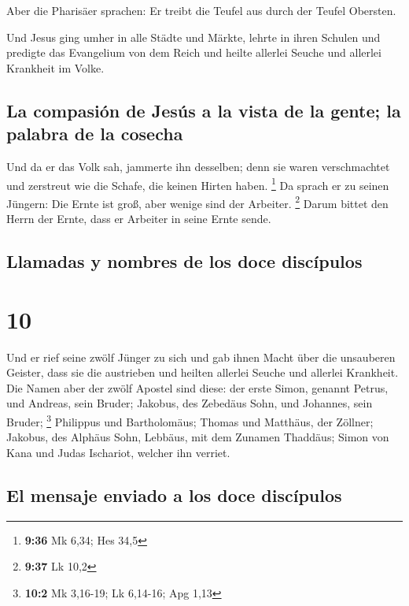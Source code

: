 Aber die Pharisäer sprachen: Er treibt die Teufel aus
durch der Teufel Obersten.

 Und Jesus ging umher in alle Städte und Märkte, lehrte
in ihren Schulen und predigte das Evangelium von dem Reich und heilte
allerlei Seuche und allerlei Krankheit im Volke.

\hypertarget{la-compasiuxf3n-de-jesuxfas-a-la-vista-de-la-gente-la-palabra-de-la-cosecha}{%
\subsection{La compasión de Jesús a la vista de la gente; la palabra de
la
cosecha}\label{la-compasiuxf3n-de-jesuxfas-a-la-vista-de-la-gente-la-palabra-de-la-cosecha}}

 Und da er das Volk sah, jammerte ihn desselben; denn sie
waren verschmachtet und zerstreut wie die Schafe, die keinen Hirten
haben. \footnote{\textbf{9:36} Mk 6,34; Hes 34,5}  Da
sprach er zu seinen Jüngern: Die Ernte ist groß, aber wenige sind der
Arbeiter. \footnote{\textbf{9:37} Lk 10,2}  Darum bittet
den Herrn der Ernte, dass er Arbeiter in seine Ernte sende.

\hypertarget{llamadas-y-nombres-de-los-doce-discuxedpulos}{%
\subsection{Llamadas y nombres de los doce
discípulos}\label{llamadas-y-nombres-de-los-doce-discuxedpulos}}

\hypertarget{section-9}{%
\section{10}\label{section-9}}

 Und er rief seine zwölf Jünger zu sich und gab ihnen
Macht über die unsauberen Geister, dass sie die austrieben und heilten
allerlei Seuche und allerlei Krankheit.  Die Namen aber
der zwölf Apostel sind diese: der erste Simon, genannt Petrus, und
Andreas, sein Bruder; Jakobus, des Zebedäus Sohn, und Johannes, sein
Bruder; \footnote{\textbf{10:2} Mk 3,16-19; Lk 6,14-16; Apg 1,13}
 Philippus und Bartholomäus; Thomas und Matthäus, der
Zöllner; Jakobus, des Alphäus Sohn, Lebbäus, mit dem Zunamen Thaddäus;
 Simon von Kana und Judas Ischariot, welcher ihn verriet.

\hypertarget{el-mensaje-enviado-a-los-doce-discuxedpulos}{%
\subsection{El mensaje enviado a los doce
discípulos}\label{el-mensaje-enviado-a-los-doce-discuxedpulos}}

